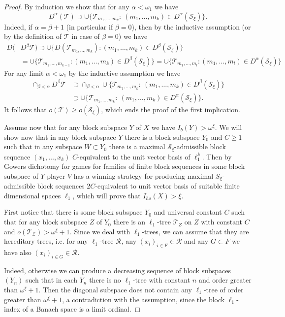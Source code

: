 \documentclass[a4paper]{amsart}
\theoremstyle{plain}
\newcommand{\mc}{\mathcal}
\newcommand{\al}{\alpha}
\begin{document}
\begin{proof}
By induction we show that for any $\al<\omega_1$ we have
$$
D^\al(\mc{T})\supset \cup\{\mc{T}_{m_1,\dots,m_k}:\
(m_1,\dots,m_k)\in D^\al(\mc{S}_\xi)\}.
$$
Indeed, if $\al=\beta+1$ (in particular if $\beta=0$), then by
the inductive assumption (or by the definition of $\mc{T}$ in case of
$\beta=0$) we have
\begin{align*}
D(&D^\beta\mc{T})
\supset 
\cup\{D (\mc{T}_{m_1,\dots,m_k}): (m_1,\dots,m_k)\in
D^\beta(\mc{S}_\xi)\}
\\
&
=\cup\{\mc{T}_{m_1,\dots,m_{k-1}}:
(m_1,\dots,m_k)\in D^\beta(\mc{S}_\xi)\}
=
\cup\{\mc{T}_{m_1,\dots,m_l}: (m_1,\dots,m_l)\in D^\al
(\mc{S}_\xi)\}
\end{align*}
For any limit $\al<\omega_1$ by the inductive assumption we have
\begin{align*}
\cap_{\beta<\al}D^\beta\mc{T}&\supset \cap_{\beta<\al}\cup\{
\mc{T}_{m_1,\dots,m_k}:\ (m_1,\dots,m_k)\in
D^\beta(\mc{S}_\xi)\}
\\
&\supset
\cup\{\mc{T}_{m_1,\dots,m_k}:\ (m_1,\dots,m_k)\in D^\al (\mc{S}_\xi)\}.
\end{align*}
It follows that $o(\mc{T})\geq o(\mc{S}_\xi)$, which ends the
proof of the first implication.

Assume now that for any block subspace $Y$ of $X$ we have $I_b(Y)>\omega^\xi$. We will
show now that in any block subspace $Y$ there is a block subspace $Y_0$ and $C\geq 1$
such that in any subspace $W\subset Y_0$ there is a maximal $\mc{S}_\xi$-admissible block
sequence $(x_1,\dots,x_k)$ $C$-equivalent to the unit vector basis of $\ell_{1}^k$. Then
by Gowers dichotomy for games for families of finite block sequences \cite{G} in some
block subspace of $Y$ player $V$ has a winning strategy for producing maximal
$S_\xi$-admissible block sequences $2C$-equivalent to unit vector basis of suitable
finite dimensional spaces $\ell_{1}$, which will prove that $I_{hs}(X)>\xi$.

First notice that there is some block subspace $Y_0$ and universal
constant $C$ such that for any block subspace $Z$ of $Y_0$ there
is an $\ell_{1}$-tree $\mc{T}_Z$ on $Z$ with constant $C$ and
$o(\mc{T_{Z}})>\omega^\xi+1$. Since we deal with $\ell_{1}$-trees, we
can assume that they are hereditary trees, i.e. for any
$\ell_{1}$-tree $\mc{R}$, any $(x_i)_{i\in F}\in \mc{R}$ and any
$G\subset F$ we have also $(x_i)_{i\in G}\in \mc{R}$.

Indeed, otherwise we can produce a decreasing sequence of block
subspaces $(Y_n)$ such that in each $Y_n$ there is no
$\ell_{1}$-tree with constant $n$ and order greater than
$\omega^\xi+1$. Then the diagonal subspace does not contain any
$\ell_{1}$-tree of order greater than $\omega^\xi+1$, a
contradiction with the assumption, since the block  $\ell_{1}$-index
of a Banach space is a limit ordinal.


\end{proof}
\end{document}
